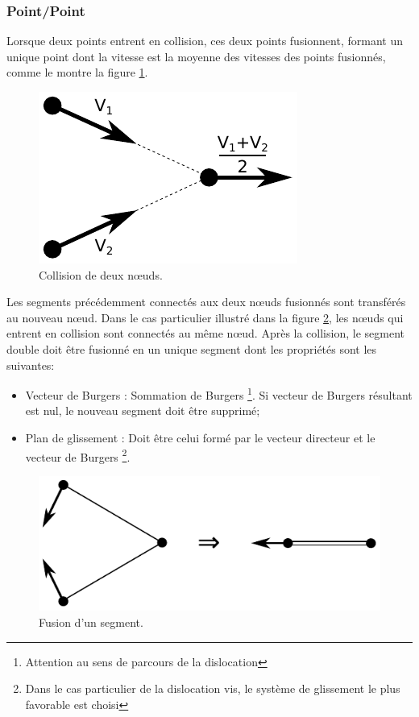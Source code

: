 \documentclass[11pt,class=article,float=false,crop=false]{standalone}
\begin{document}
\subsubsection{Point/Point}

Lorsque deux points entrent en collision, ces deux points fusionnent, formant un unique point dont la vitesse est la moyenne des vitesses des points fusionnés, comme le montre la figure \ref{fig:topo_pointpoint}. 

\begin{figure}[H]
	\centering
	\includegraphics[height=0.15\textheight]{img/topo_pointpoint}
	\caption{Collision de deux nœuds.}
	\label{fig:topo_pointpoint}
\end{figure}

Les segments précédemment connectés aux deux nœuds fusionnés sont transférés au nouveau nœud. Dans le cas particulier illustré dans la figure \ref{fig:topo_fusionsegments}, les nœuds qui entrent en collision sont connectés au même nœud. Après la collision, le segment double doit être fusionné en un unique segment dont les propriétés sont les suivantes:
\begin{itemize}	
	\item Vecteur de Burgers : Sommation de Burgers \footnote{Attention au sens de parcours de la dislocation}. Si vecteur de Burgers résultant est nul, le nouveau segment doit être supprimé;
	\item Plan de glissement : Doit être celui formé par le vecteur directeur et le vecteur de Burgers \footnote{Dans le cas particulier de la dislocation vis, le système de glissement le plus favorable est choisi }. 
\end{itemize}

\begin{figure}[H]
	\centering
	\includegraphics[height=0.15\textheight]{img/topo_fusionsegments}
	\caption{Fusion d'un segment.}
	\label{fig:topo_fusionsegments}
\end{figure}
\end{document}
